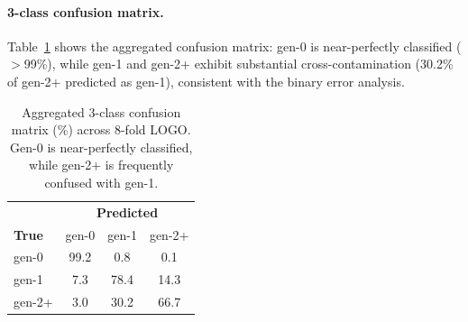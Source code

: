 \paragraph{3-class confusion matrix.}
Table~\ref{tab:confusion-3class} shows the aggregated confusion matrix: gen-0 is near-perfectly classified ($>$99\%), while gen-1 and gen-2+ exhibit substantial cross-contamination (30.2\% of gen-2+ predicted as gen-1), consistent with the binary error analysis.

\begin{table}[ht]
\centering
\small
\caption{Aggregated 3-class confusion matrix (\%) across 8-fold LOGO. Gen-0 is near-perfectly classified, while gen-2+ is frequently confused with gen-1.}
\label{tab:confusion-3class}
\begin{tabular}{l|ccc}
\toprule
 & \multicolumn{3}{c}{\textbf{Predicted}} \\
\textbf{True} & gen-0 & gen-1 & gen-2+ \\
\midrule
gen-0 & 99.2 & 0.8 & 0.1 \\
gen-1 & 7.3 & 78.4 & 14.3 \\
gen-2+ & 3.0 & 30.2 & 66.7 \\
\bottomrule
\end{tabular}
\end{table}
